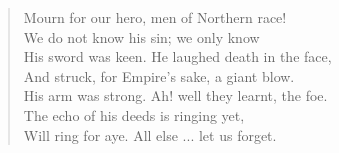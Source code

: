 \begin{verse}
Mourn for our hero, men of Northern race!\\
\hspace*{3em}We do not know his sin; we only know\\
His sword was keen. He laughed death in the face,\\
\hspace*{3em}And struck, for Empire's sake, a giant blow.\\
\hspace*{3em}His arm was strong. Ah! well they learnt, the foe.\\
The echo of his deeds is ringing yet,\\
Will ring for aye. All else ... let us forget.

\end{verse}
